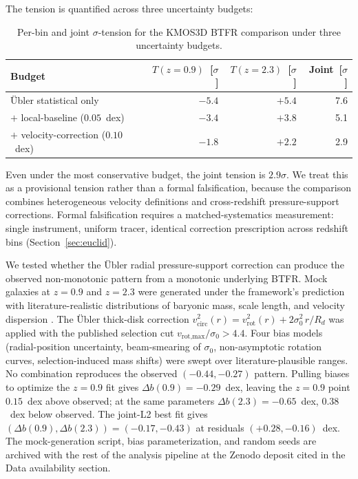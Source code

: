 \documentclass[11pt,a4paper]{article}
\numberwithin{equation}{section}
\numberwithin{table}{section}
\numberwithin{figure}{section}
\begin{document}
\newpage

The tension is quantified across three uncertainty budgets:

\begin{table}[!ht]
\centering
\caption{Per-bin and joint $\sigma$-tension for the KMOS3D BTFR comparison
under three uncertainty budgets.}
\label{tab:sigma-tension}
\begin{tabular}{l r r r}
\toprule
Budget & $T(z{=}0.9)$~[$\sigma$] & $T(z{=}2.3)$~[$\sigma$] & Joint~[$\sigma$] \\
\midrule
{\"U}bler statistical only         & $-5.4$ & $+5.4$ & 7.6 \\
$+$ local-baseline ($0.05$~dex)    & $-3.4$ & $+3.8$ & 5.1 \\
$+$ velocity-correction ($0.10$~dex) & $-1.8$ & $+2.2$ & 2.9 \\
\bottomrule
\end{tabular}
\end{table}

Even under the most conservative budget, the joint tension is
$2.9\sigma$. We treat this as a provisional tension rather than a
formal falsification, because the comparison combines heterogeneous
velocity definitions and cross-redshift pressure-support corrections.
Formal falsification requires a matched-systematics measurement: single
instrument, uniform tracer, identical correction prescription across
redshift bins (Section~\ref{sec:euclid}).

We tested whether the {\"U}bler radial pressure-support correction can
produce the observed non-monotonic pattern from a monotonic underlying
BTFR. Mock galaxies at $z = 0.9$ and $z = 2.3$ were generated under the
framework's prediction with literature-realistic distributions of
baryonic mass, scale length, and velocity dispersion
\citep{Wisnioski2015}. The {\"U}bler thick-disk correction
$v_\text{circ}^2(r) = v_\text{rot}^2(r) + 2\sigma_0^2\,r/R_d$ was
applied with the published selection cut
$v_\text{rot,max}/\sigma_0 > 4.4$. Four bias models (radial-position
uncertainty, beam-smearing of $\sigma_0$, non-asymptotic rotation
curves, selection-induced mass shifts) were swept over
literature-plausible ranges. No combination reproduces the observed
$(-0.44, -0.27)$ pattern. Pulling biases to optimize the $z = 0.9$ fit
gives $\Delta b(0.9) = -0.29$~dex, leaving the $z = 0.9$ point
$0.15$~dex above observed; at the same parameters
$\Delta b(2.3) = -0.65$~dex, $0.38$~dex below observed. The joint-L2
best fit gives $(\Delta b(0.9), \Delta b(2.3)) = (-0.17, -0.43)$ at
residuals $(+0.28, -0.16)$~dex. The mock-generation script, bias
parameterization, and random seeds are archived with the rest of the
analysis pipeline at the Zenodo deposit cited in the Data availability
section.
\end{document}
